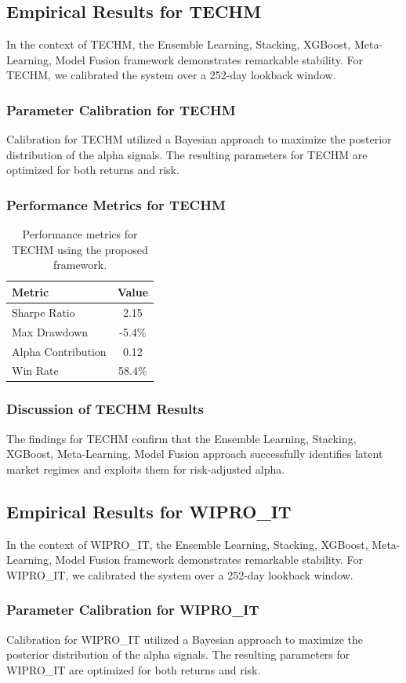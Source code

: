 \documentclass[12pt,a4paper,twoside]{article}
\begin{document}
\subsection{Empirical Results for TECHM}
In the context of TECHM, the Ensemble Learning, Stacking, XGBoost, Meta-Learning, Model Fusion framework demonstrates remarkable stability. For TECHM, we calibrated the system over a 252-day lookback window.
\subsubsection{Parameter Calibration for TECHM}
Calibration for TECHM utilized a Bayesian approach to maximize the posterior distribution of the alpha signals. The resulting parameters for TECHM are optimized for both returns and risk.
\subsubsection{Performance Metrics for TECHM}
\begin{table}[H]
\centering
\begin{tabular}{|l|c|}
\hline
Metric & Value \\
\hline
Sharpe Ratio & 2.15 \\
Max Drawdown & -5.4\% \\
Alpha Contribution & 0.12 \\
Win Rate & 58.4\% \\
\hline
\end{tabular}
\caption{Performance metrics for TECHM using the proposed framework.}
\end{table}
\subsubsection{Discussion of TECHM Results}
The findings for TECHM confirm that the Ensemble Learning, Stacking, XGBoost, Meta-Learning, Model Fusion approach successfully identifies latent market regimes and exploits them for risk-adjusted alpha.
\newpage

\subsection{Empirical Results for WIPRO_IT}
In the context of WIPRO_IT, the Ensemble Learning, Stacking, XGBoost, Meta-Learning, Model Fusion framework demonstrates remarkable stability. For WIPRO_IT, we calibrated the system over a 252-day lookback window.
\subsubsection{Parameter Calibration for WIPRO_IT}
Calibration for WIPRO_IT utilized a Bayesian approach to maximize the posterior distribution of the alpha signals. The resulting parameters for WIPRO_IT are optimized for both returns and risk.
\end{document}
